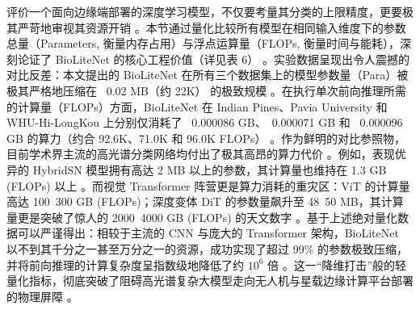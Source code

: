 \begin{table}[htbp]
\centering
\caption{所有模型的参数量与计算量（FLOPs）。}
\label{tab:parameters_flops}
\end{table}

评价一个面向边缘端部署的深度学习模型，不仅要考量其分类的上限精度，更要极其严苛地审视其资源开销 。本节通过量化比较所有模型在相同输入维度下的参数总量（Parameters, 衡量内存占用）与浮点运算量（FLOPs, 衡量时间与能耗），深刻论证了 BioLiteNet 的核心工程价值（详见表 6） 。实验数据呈现出令人震撼的对比反差：本文提出的 BioLiteNet 在所有三个数据集上的模型参数量（Para）被极其严格地压缩在 ~0.02 MB（约 22K） 的极致规模 。在执行单次前向推理所需的计算量（FLOPs）方面，BioLiteNet 在 Indian Pines、Pavia University 和 WHU-Hi-LongKou 上分别仅消耗了 ~0.000086 GB、~0.000071 GB 和 ~0.000096 GB 的算力（约合 92.6K、71.0K 和 96.0K FLOPs） 。作为鲜明的对比参照物，目前学术界主流的高光谱分类网络均付出了极其高昂的算力代价 。例如，表现优异的 HybridSN 模型拥有高达 2 MB 以上的参数，其计算量也维持在 1.3 GB (FLOPs) 以上 。而视觉 Transformer 阵营更是算力消耗的重灾区：ViT 的计算量高达 100~300 GB (FLOPs)；深度变体 DiT 的参数量飙升至 48~50 MB，其计算量更是突破了惊人的 2000~4000 GB (FLOPs) 的天文数字 。基于上述绝对量化数据可以严谨得出：相较于主流的 CNN 与庞大的 Transformer 架构，BioLiteNet 以不到其千分之一甚至万分之一的资源，成功实现了超过 99\% 的参数极致压缩，并将前向推理的计算复杂度呈指数级地降低了约 $10^6$ 倍 。这一“降维打击”般的轻量化指标，彻底突破了阻碍高光谱复杂大模型走向无人机与星载边缘计算平台部署的物理屏障 。

